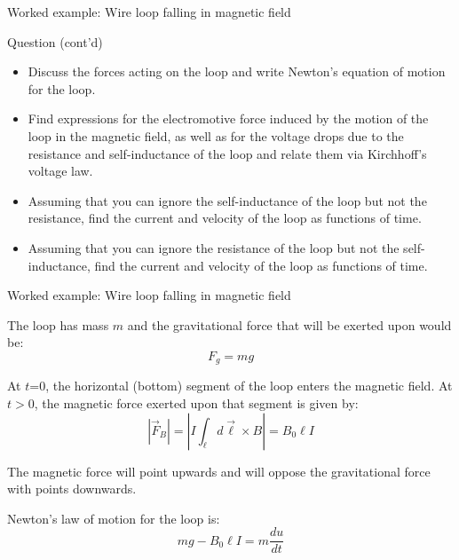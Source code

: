 {\begin{frame}{Worked example: Wire loop falling in magnetic field}
  \begin{blockexmplque}{Question (cont'd)}
    \begin{itemize}
      \item
      Discuss the forces acting on the loop and write
      Newton’s equation of motion for the loop.
      \item
      Find expressions for the electromotive force induced by the motion
      of the loop in the magnetic field, as well as for the voltage drops
      due to the resistance and self-inductance of the loop and relate
      them via Kirchhoff’s voltage law.
      \item
      Assuming that you can ignore the self-inductance of the loop
      but not the resistance,
      find the current and velocity of the loop as functions of time.
      \item
      Assuming that you can ignore the resistance of the loop
      but not the self-inductance,
      find the current and velocity of the loop as functions of time.
    \end{itemize}
  \end{blockexmplque}

\end{frame}

%
%
%

\begin{frame}{Worked example: Wire loop falling in magnetic field}


  The loop has mass $m$ and the gravitational force that
  will be exerted upon would be:
  \begin{equation*}
    F_{g} = mg
  \end{equation*}

  At $t$=0, the horizontal (bottom) segment of the loop
  enters the magnetic field. At $t>0$, the magnetic force exerted
  upon that segment is given by:
  \begin{equation*}
    |\vec{F}_{B}| = | I \int_{\ell} d\vec{\ell} \times B | = B_0 \ell I
  \end{equation*}

  The magnetic force will point upwards and will oppose the
  gravitational force with points downwards.\\
  \vspace{0.2cm}

  Newton's law of motion for the loop is:
  \begin{equation*}
    mg - B_0 \ell I = m \frac{du}{dt}
  \end{equation*}


\end{frame}}
